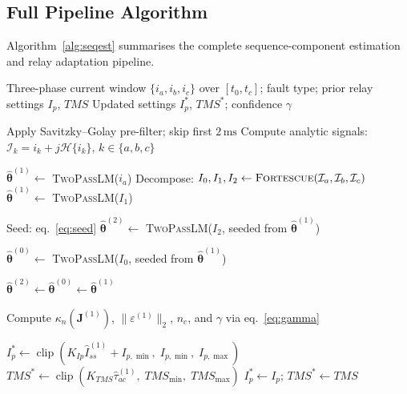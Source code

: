 \documentclass[10pt,journal,twoside]{IEEEtran}
\newcommand{\mss}{\,\text{ms}}
\newcommand{\Hilb}{\mathcal{H}}
\newcommand{\Ical}{\mathcal{I}}
\begin{document}
\subsection{Full Pipeline Algorithm}
\label{sec:pipeline:alg}

Algorithm~\ref{alg:seqest} summarises the complete sequence-component
estimation and relay adaptation pipeline.

\begin{algorithm}[!t]
\caption{Sequence-Component Inverse Estimation and Relay Update}
\label{alg:seqest}
\begin{algorithmic}[1]
\Require Three-phase current window $\{i_a, i_b, i_c\}$ over $[t_0, t_c]$;
         fault type; prior relay settings $I_p$, $TMS$
\Ensure Updated settings $I_p^*$, $TMS^*$; confidence $\gamma$

\State Apply Savitzky--Golay pre-filter; skip first $2\mss$
\State Compute analytic signals: $\Ical_k = i_k + j\Hilb\{i_k\}$,
       $k \in \{a, b, c\}$

   \State $\hat{\bm\theta}^{(1)} \leftarrow$ \textsc{TwoPassLM}($i_a$)
\Else
   \State Decompose: $I_0, I_1, I_2 \leftarrow
          \textsc{Fortescue}(\Ical_a, \Ical_b, \Ical_c)$
   \State $\hat{\bm\theta}^{(1)} \leftarrow$ \textsc{TwoPassLM}($I_1$)

      \State Seed: eq.~\eqref{eq:seed}
      \State $\hat{\bm\theta}^{(2)} \leftarrow$
             \textsc{TwoPassLM}($I_2$, seeded from $\hat{\bm\theta}^{(1)}$)
   \EndIf

      \State $\hat{\bm\theta}^{(0)} \leftarrow$
             \textsc{TwoPassLM}($I_0$, seeded from $\hat{\bm\theta}^{(1)}$)
   \EndIf

      \State $\hat{\bm\theta}^{(2)} \leftarrow \hat{\bm\theta}^{(0)}
             \leftarrow \hat{\bm\theta}^{(1)}$ 
   \EndIf
\EndIf

\State Compute $\kappa_n(\mathbf{J}^{(1)})$, $\|\varepsilon^{(1)}\|_2$,
       $n_c$, and $\gamma$ via eq.~\eqref{eq:gamma}

   \State $I_p^* \leftarrow \operatorname{clip}(K_{Ip}\hat{I}_{ss}^{(1)}
          + I_{p,\min},\; I_{p,\min},\; I_{p,\max})$
   \State $TMS^* \leftarrow \operatorname{clip}(K_{TMS}\hat{\tau}_{ac}^{(1)},\;
          TMS_{\min},\; TMS_{\max})$
\Else
   \State $I_p^* \leftarrow I_p$;\; $TMS^* \leftarrow TMS$
\EndIf
\end{algorithmic}
\end{algorithm}
\end{document}
